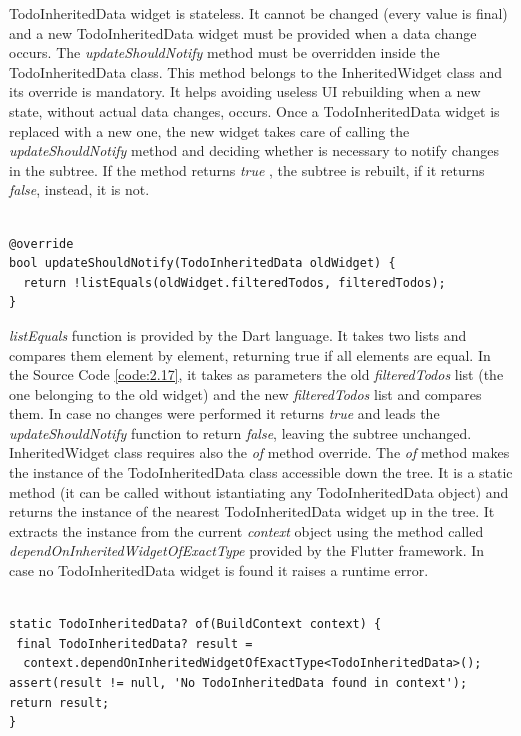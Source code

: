 TodoInheritedData widget is stateless. It cannot be changed (every value is final) and a new TodoInheritedData widget must be provided when a data change occurs. 
The \textit{updateShouldNotify }method must be overridden inside the TodoInheritedData class. This method belongs to the InheritedWidget class and its override is mandatory. It helps avoiding useless UI rebuilding when a new state, without actual data changes, occurs. Once a TodoInheritedData widget is replaced with a new one, the new widget takes care of calling the \textit{updateShouldNotify }method and deciding whether is necessary to notify changes in the subtree. If the method returns \textit{true }, the subtree is rebuilt, if  it returns \textit{false}, instead, it is not.
\mbox{}\\
\begin{code}
 \mbox{}

\label{code:2.17}
\begin{verbatim}

@override
bool updateShouldNotify(TodoInheritedData oldWidget) {
  return !listEquals(oldWidget.filteredTodos, filteredTodos);
}
\end{verbatim}
\end{code}

\textit{listEquals }function is provided by the Dart language. It takes two lists and compares them element by element, returning true if all elements are equal. In the Source Code \ref{code:2.17}, it takes as parameters the old \textit{filteredTodos} list (the one belonging to the old widget)  and the new \textit{filteredTodos} list and compares them. In case no changes were performed it returns \textit{true} and leads the \textit{updateShouldNotify }function to return \textit{false}, leaving the subtree unchanged.\\
InheritedWidget class requires also the \textit{of} method override. The \textit{of }method makes the instance of the TodoInheritedData class accessible down the tree. It is a static method (it can be called without istantiating any TodoInheritedData object) and returns the instance of the nearest TodoInheritedData widget up in the tree. It extracts the instance from the current \textit{context} object using the method called \textit{dependOnInheritedWidgetOfExactType} provided by the Flutter framework. In case no TodoInheritedData widget is found it raises a runtime error.
\mbox{}
\begin{code}
 \mbox{}
\label{code:2.18}
\begin{verbatim}

static TodoInheritedData? of(BuildContext context) {
 final TodoInheritedData? result =
  context.dependOnInheritedWidgetOfExactType<TodoInheritedData>(); 
assert(result != null, 'No TodoInheritedData found in context');
return result;
}
\end{verbatim}
\end{code}

